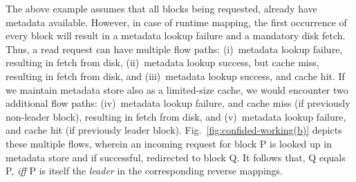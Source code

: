 The above example assumes that all blocks being requested, already
have metadata available. However, in case of
runtime mapping, the first occurrence of every block will result in a
metadata lookup failure and a mandatory disk fetch.
Thus, a read request can have multiple flow paths:
(i)~metadata lookup failure, resulting in fetch from disk,
(ii)~metadata lookup success, but cache miss, resulting in fetch from disk, and
(iii)~metadata lookup success, and cache hit.
If we maintain metadata store also as a limited-size cache, 
we would encounter two additional flow paths:
(iv)~metadata lookup failure, and cache miss (if previously 
non-leader block), resulting in fetch from disk, and
(v)~metadata lookup failure, and cache hit (if previously leader block).
Fig.~\ref{fig:confided-working(b)} depicts these multiple flows,
wherein an incoming request for block P is looked up in metadata store and if
successful, redirected to block Q. It follows that, Q equals P, \textit{iff}
P is itself the \textit{leader} in the corresponding reverse mappings.

